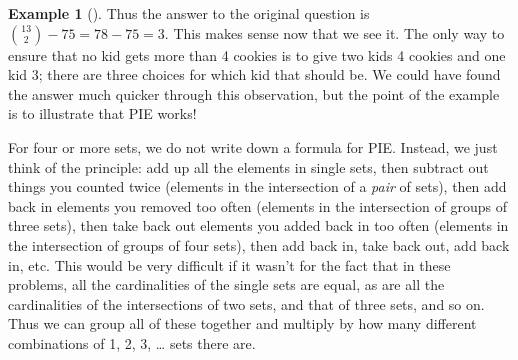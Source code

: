 \documentclass[10pt,]{book}
\theoremstyle{plain}
\theoremstyle{definition}
\newtheorem{example}[theorem]{Example}
\theoremstyle{definition}
\theoremstyle{definition}
\numberwithin{equation}{chapter}
\begin{document}
\begin{example}[]
          Thus the answer to the original question is \({13 \choose 2} - 75 = 78 - 75 = 3\). This makes sense now that we see it. The only way to ensure that no kid gets more than 4 cookies is to give two kids 4 cookies and one kid 3; there are three choices for which kid that should be. We could have found the answer much quicker through this observation, but the point of the example is to illustrate that PIE works!
\end{example}
\par

      For four or more sets, we do not write down a formula for PIE. Instead, we just think of the principle: add up all the elements in single sets, then subtract out things you counted twice (elements in the intersection of a \emph{pair} of sets), then add back in elements you removed too often (elements in the intersection of groups of three sets), then take back out elements you added back in too often (elements in the intersection of groups of four sets), then add back in, take back out, add back in, etc. This would be very difficult if it wasn't for the fact that in these problems, all the cardinalities of the single sets are equal, as are all the cardinalities of the intersections of two sets, and that of three sets, and so on. Thus we can group all of these together and multiply by how many different combinations of 1, 2, 3,
      \dots{} sets there are.
\end{document}
